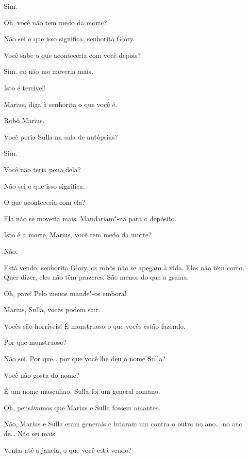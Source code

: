  Sim.

 Oh, você não tem medo da morte?

 Não sei o que isso significa, senhorita Glory.

 Você sabe o que aconteceria com você depois?

 Sim, eu não me moveria mais.

 Isto é terrível!

 Marius, diga à senhorita o que você é.

 Robô Marius.

 Você poria Sulla na sala de autópsias?

 Sim.

 Você não teria pena dela?

 Não sei o que isso significa.

 O que aconteceria com ela?

 Ela não se moveria mais. Mandariam"-na para o depósito.

 Isto é a morte, Marius, você tem medo da morte?

 Não.

 Está vendo, senhorita Glory, os robôs não se apegam à vida. Eles não têm
como. Quer dizer, eles não têm prazeres. São menos do que a grama.

 Oh, pare! Pelo menos mande"-os embora!

 Marius, Sulla, vocês podem sair.

 Vocês são horríveis! É monstruoso o que vocês estão fazendo.

 Por que monstruoso?

 Não sei. Por que\ldots{} por que você lhe deu o nome Sulla?

 Você não gosta do nome?

 É um nome masculino. Sulla foi um general romano.

 Oh, pensávamos que Marius e Sulla fossem \mbox{amantes}.

 Não, Marius e Sulla eram generais e lutaram um contra o outro no ano\ldots{}
no ano de\ldots{} Não sei mais.

 Venha até a janela, o que você está vendo?

